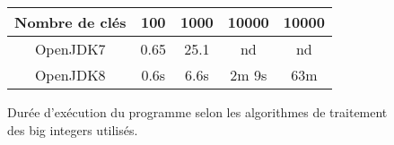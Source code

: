 \documentclass[a4paper,10pt]{article}
\begin{document}
\begin{figure}[ht]
  \begin{center}
    \begin{tabular}{ccccc}
      \toprule
      Nombre de clés & 100 & 1000 & 10000 & 10000\\
      \toprule
      OpenJDK7 & 0.65 & 25.1 & nd & nd\\
      \midrule
      OpenJDK8 & 0.6s & 6.6s & 2m 9s & 63m\\
      \bottomrule
    \end{tabular}
    \caption{\label{tab:jdkVersions}Durée d'exécution du programme selon les algorithmes de traitement des big integers utilisés.}
    
  \end{center}
\end{figure}
\end{document}
